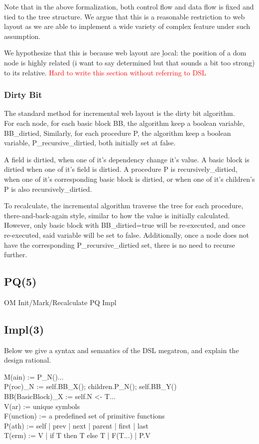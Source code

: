 \documentclass[format=acmsmall, review=false, screen=true]{acmart}
\newcommand\todo[1]{\textcolor{red}{#1}}
\begin{document}
Note that in the above formalization, both control flow and data flow is fixed and tied to the tree structure. We argue that this is a reasonable restriction to web layout as we are able to implement a wide variety of complex feature under such assumption.

We hypothesize that this is because web layout are \b{local}: the position of a dom node is highly related (i want to say determined but that sounds a bit too strong) to its relative. \todo{Hard to write this section without referring to DSL}

\subsubsection{Dirty Bit}
The standard method for incremental web layout is the dirty bit algorithm. \\
For each node, for each basic block BB, the algorithm keep a boolean variable, BB\_dirtied, Similarly, for each procedure P, the algorithm keep a boolean variable, P\_recursive\_dirtied, both initially set at false.

A field is dirtied, when one of it's dependency change it's value. A basic block is dirtied when one of it's field is dirtied. A procedure P is recursively\_dirtied, when one of it's corresponding basic block is dirtied, or when one of it's children's P is also recursively\_dirtied.

To recalculate, the incremental algorithm traverse the tree for each procedure, there-and-back-again style, similar to how the value is initially calculated. However, only basic block with BB\_dirtied=true will be re-executed, and once re-executed, said variable will be set to false. Additionally, once a node does not have the corresponding P\_recursive\_dirtied set, there is no need to recurse further.

\subsection{PQ(5)}
OM
Init/Mark/Recalculate
PQ Impl
\subsection{Impl(3)}
Below we give a syntax and semantics of the DSL megatron, and explain the design rational.

M(ain) := P\_N()... \\
P(roc)\_N := self.BB\_X(); children.P\_N(); self.BB\_Y() \\
BB(BasicBlock)\_X := self.N <- T... \\
V(ar) := unique symbols \\
F(unction) := a predefined set of primitive functions \\
P(ath) := self | prev | next | parent | first | last \\
T(erm) := V | if T then T else T | F(T...) | P.V
\end{document}

